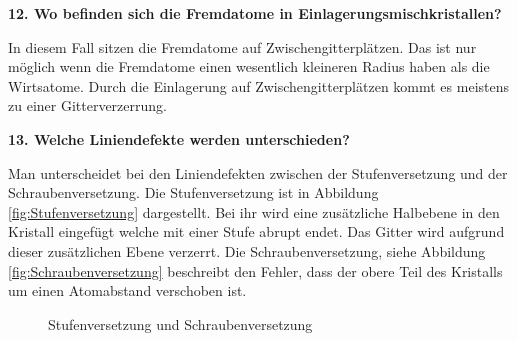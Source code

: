 \noindent\textbf{12. Wo befinden sich die Fremdatome in Einlagerungsmischkristallen?}\\
\begin{addmargin}[25pt]{0pt}    
In diesem Fall sitzen die Fremdatome auf Zwischengitterplätzen. Das ist nur möglich wenn die Fremdatome einen wesentlich kleineren Radius haben als die Wirtsatome. Durch die Einlagerung auf Zwischengitterplätzen kommt es meistens zu einer Gitterverzerrung.\\
\end{addmargin}

\noindent\textbf{13. Welche Liniendefekte werden unterschieden?}\\
\begin{addmargin}[25pt]{0pt}    
Man unterscheidet bei den Liniendefekten zwischen der Stufenversetzung und der Schraubenversetzung. Die Stufenversetzung ist in Abbildung \ref{fig:Stufenversetzung} dargestellt. Bei ihr wird eine zusätzliche Halbebene in den Kristall eingefügt welche mit einer Stufe abrupt endet. Das Gitter wird aufgrund dieser zusätzlichen Ebene verzerrt. Die Schraubenversetzung, siehe Abbildung \ref{fig:Schraubenversetzung} beschreibt den Fehler, dass der obere Teil des Kristalls um einen Atomabstand verschoben ist. 

\begin{figure}[h]
  \centering
  \qquad
\caption{Stufenversetzung und Schraubenversetzung}
\label{fig:Liniendefekte}
\end{figure}

\end{addmargin}

